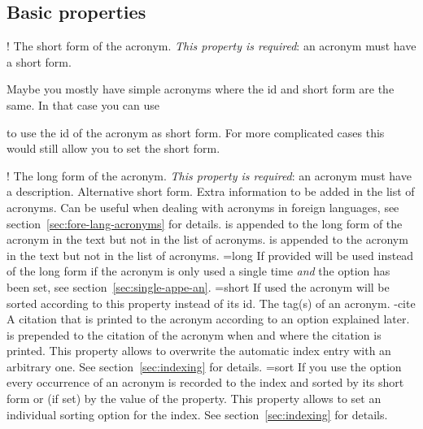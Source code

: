 \documentclass{acro-manual}
\begin{document}
\subsection{Basic properties}\label{sec:basic-properties}
\begin{properties}
  \Default!
    The short form of the acronym.  \emph{This property is required}: an
    acronym must have a short form.
\end{properties}
Maybe you mostly have simple acronyms where the \ac{id} and short form are
the same.  In that case you can use
\begin{options}
    to use the \ac{id} of the acronym as short form. For more complicated
    cases this would still allow you to set the short form.
\end{options}
\begin{properties}
  \Default!
    The long form of the acronym.  \emph{This property is required}: an
    acronym must have a description.
  \Default
    Alternative short form.
  \Default
    Extra information to be added in the list of acronyms.
  \Default
    Can be useful when dealing with acronyms in foreign languages, see
    section~\vref{sec:fore-lang-acronyms} for details.
  \Default
     is appended to the long form of the acronym in the text but
    not in the list of acronyms.
  \Default
     is appended to the acronym in the text but not in the list of
    acronyms.
  \Default={long}
    If provided  will be used instead of the long form if the
    acronym is only used a single time \emph{and} the option
     has been set, see section~\vref{sec:single-appe-an}.
  \Default={short}
    If used the acronym will be sorted according to this property instead of
    its \ac{id}.
  \Default
    The tag(s) of an acronym.
  \proplit-{cite}{}\Default
    A citation that is printed to the acronym according to an option explained
    later.
  \Default
     is prepended to the citation of the acronym when and where
    the citation is printed.
  \Default
    This property allows to overwrite the automatic index entry with an
    arbitrary one.  See section~\vref{sec:indexing} for details.
  \Default={sort}
    If you use the option  every occurrence of an acronym is
    recorded to the index and sorted by its short form or (if set) by the
    value of the  property.  This property allows to set an
    individual sorting option for the index.  See section~\vref{sec:indexing}
    for details.
\end{properties}
\end{document}
